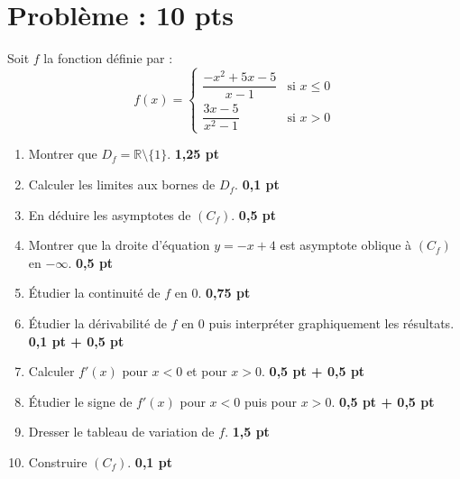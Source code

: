 \documentclass[12pt,a4paper]{article}
\begin{document}
\section*{Problème : 10 pts}

Soit \( f \) la fonction définie par :
\[
f(x) = 
\begin{cases}
\dfrac{-x^2 + 5x - 5}{x - 1} & \text{si } x \leq 0 \\
\dfrac{3x - 5}{x^2 - 1} & \text{si } x > 0
\end{cases}
\]

\begin{enumerate}
    \item Montrer que \( D_f = \mathbb{R} \setminus \{1\} \). \hfill \textbf{1{,}25 pt}
    
    \item Calculer les limites aux bornes de \( D_f \). \hfill \textbf{0{,}1 pt}
    
    \item En déduire les asymptotes de \( (C_f) \). \hfill \textbf{0{,}5 pt}
    
    \item Montrer que la droite d’équation \( y = -x + 4 \) est asymptote oblique à \( (C_f) \) en \( -\infty \). \hfill \textbf{0{,}5 pt}
    
    \item Étudier la continuité de \( f \) en \( 0 \). \hfill \textbf{0{,}75 pt}
    
    \item Étudier la dérivabilité de \( f \) en \( 0 \) puis interpréter graphiquement les résultats. \hfill \textbf{0{,}1 pt + 0{,}5 pt}
    
    \item Calculer \( f'(x) \) pour \( x < 0 \) et pour \( x > 0 \). \hfill \textbf{0{,}5 pt + 0{,}5 pt}
    
    \item Étudier le signe de \( f'(x) \) pour \( x < 0 \) puis pour \( x > 0 \). \hfill \textbf{0{,}5 pt + 0{,}5 pt}
    
    \item Dresser le tableau de variation de \( f \). \hfill \textbf{1{,}5 pt}
    
    \item Construire \( (C_f) \). \hfill \textbf{0{,}1 pt}
\end{enumerate}
\end{document}
